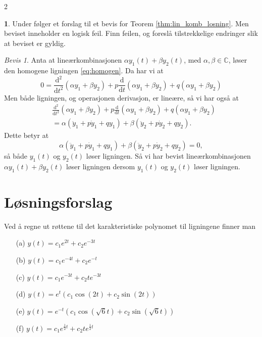 \documentclass{article}
\theoremstyle{definition}
\newtheorem{oppg}{}
\newenvironment{customoppg}[1]
{\renewcommand\theinnercustomoppg{#1}\innercustomoppg}
{\endinnercustomoppg}
\theoremstyle{remark}
\newtheorem*{bevis}{Bevis}
\begin{document}
\begin{multicols*}{2}
\begin{oppg} \label{oppg:bevis}
  Under følger et forslag til et bevis for Teorem \ref{thm:lin_komb_losning}. Men beviset inneholder en logisk feil. Finn feilen, og foreslå tilstrekkelige endringer slik at beviset er gyldig.
\end{oppg}

\begin{bevis}
  Anta at lineærkombinasjonen $\alpha y_1(t) + \beta y_2(t)$, med $\alpha, \beta \in \mathbb{C}$, løser den homogene ligningen \eqref{eq:homogen}. Da har vi at 
  \begin{equation*}
    0 = \frac{\mathrm{d}^2}{\mathrm{d} t^2}(\alpha y_1 + \beta y_2) + p \frac{\mathrm{d}}{\mathrm{d} t} (\alpha y_1 + \beta y_2) + q (\alpha y_1 + \beta y_2)
  \end{equation*}
  Men både ligningen, og operasjonen derivasjon, er lineære, så vi har også at
  \begin{equation*}
    \begin{split}
      & \frac{\mathrm{d}^2}{\mathrm{d} t^2}(\alpha y_1 + \beta y_2) + p \frac{\mathrm{d}}{\mathrm{d} t} (\alpha y_1 + \beta y_2) + q (\alpha y_1 + \beta y_2) \\
      & = \alpha (\ddot{y}_1 + p \dot{y}_1 + q y_1) + \beta (\ddot{y}_2 + p \dot{y}_2 + q y_2).
    \end{split}
  \end{equation*}
  Dette betyr at
  \begin{equation*}
    \alpha (\ddot{y}_1 + p \dot{y}_1 + q y_1) + \beta (\ddot{y}_2 + p \dot{y}_2 + q y_2) = 0,
  \end{equation*}
  så både $y_1(t)$ og $y_2(t)$ løser ligningen. Så vi har bevist lineærkombinasjonen $\alpha y_1(t) + \beta y_2(t)$ løser ligningen dersom $y_1(t)$ og $y_2(t)$ løser ligningen.
\end{bevis}


\newpage
\section*{Løsningsforslag}

\begin{customoppg}{1}
  Ved å regne ut røttene til det karakteristiske polynomet til ligningene finner man
  \begin{itemize}
    \item[(a)] $y(t) = c_1 e^{2t} + c_2 e^{-3t}$
    \item[(b)] $y(t) = c_1 e^{-4t} + c_2 e^{-t}$
    \item[(c)] $y(t) = c_1 e^{-3t} + c_2 te^{-3t}$
    \item[(d)] $y(t) = e^t (c_1 \cos(2t) + c_2 \sin(2t))$
    \item[(e)] $y(t) = e^{-t} (c_1 \cos(\sqrt{6}t) + c_2 \sin(\sqrt{6}t))$
    \item[(f)] $y(t) = c_1 e^{\frac{1}{2}t} + c_2 t e^{\frac{1}{2}t}$
  \end{itemize}
\end{customoppg}


\end{multicols*}
\end{document}
